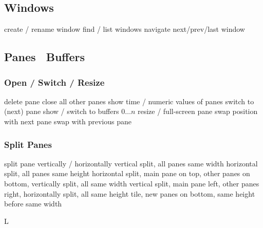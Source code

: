 \subsection{Windows}{}
	{create / rename window}
	{find / list windows}
	{navigate next/prev/last window}

\subsection{Panes \or\ Buffers}{}
\subsubsection{Open / Switch / Resize}{}
	{delete pane}
	{close all other panes}
	{show time / numeric values of panes}
	{switch to (next) pane}
	{show / switch to buffers $0 \ldots n$}
	{resize / full-screen pane}
	{swap position with next pane}
	{swap with previous pane}

\subsubsection{Split Panes}{}
	{split pane vertically / horizontally}
	{vertical split, all panes same width}
	{horizontal split, all panes same height}
	{horizontal split, main pane on top, other panes on bottom, vertically split, all same width}
	{vertical split, main pane left, other panes right, horizontally split, all same height}
	{tile, new panes on bottom, same height before same width}

\copyrightnotice

\supereject
\if L\lr \else\null\vfill\eject\fi
\bye

